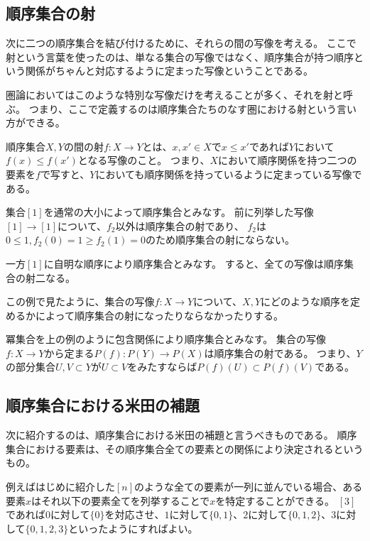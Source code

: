 \documentclass[uplatex]{jsarticle}
\begin{document}
\subsection{順序集合の射}
次に二つの順序集合を結び付けるために、それらの間の写像を考える。
ここで射という言葉を使ったのは、単なる集合の写像ではなく、順序集合が持つ順序という関係がちゃんと対応するように定まった写像ということである。

圏論においてはこのような特別な写像だけを考えることが多く、それを射と呼ぶ。
つまり、ここで定義するのは順序集合たちのなす圏における射という言い方ができる。

\begin{dfn}
順序集合$X, Y$の間の射$f:X\to Y$とは、$x, x'\in X$で$x\leq x'$であれば$Y$において$f(x)\leq f(x')$となる写像のこと。
つまり、$X$において順序関係を持つ二つの要素を$f$で写すと、$Y$においても順序関係を持っているように定まっている写像である。
\end{dfn}

\begin{eg}
集合$[1]$を通常の大小によって順序集合とみなす。
前に列挙した写像$[1]\to [1]$について、$f_2$以外は順序集合の射であり、
$f_2$は$0\leq 1, f_2(0)=1\geq f_2(1)=0$のため順序集合の射にならない。

一方$[1]$に自明な順序により順序集合とみなす。
すると、全ての写像は順序集合の射二なる。
\end{eg}

この例で見たように、集合の写像$f:X \to Y$について、$X, Y$にどのような順序を定めるかによって順序集合の射になったりならなかったりする。

\begin{eg}
冪集合を上の例のように包含関係により順序集合とみなす。
集合の写像$f:X \to Y$から定まる$P(f):P(Y) \to P(X)$は順序集合の射である。
つまり、$Y$の部分集合$U, V \subset Y$が$U\subset V$をみたすならば$P(f)(U) \subset P(f)(V)$である。
\end{eg}

\subsection{順序集合における米田の補題}
次に紹介するのは、順序集合における米田の補題と言うべきものである。
順序集合における要素は、その順序集合全ての要素との関係により決定されるというもの。

例えばはじめに紹介した$[n]$のような全ての要素が一列に並んでいる場合、ある要素$x$はそれ以下の要素全てを列挙することで$x$を特定することができる。
$[3]$であれば$0$に対して$\{0\}$を対応させ、$1$に対して$\{0,1\}$、$2$に対して$\{0,1,2\}$、$3$に対して$\{0,1,2,3\}$といったようにすればよい。
\end{document}
